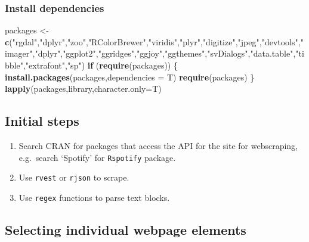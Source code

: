 \documentclass[10,portrait]{article}
\newenvironment{Shaded}{\begin{snugshade}}{\end{snugshade}}
\newcommand{\KeywordTok}[1]{\textcolor[rgb]{0.13,0.29,0.53}{\textbf{#1}}}
\newcommand{\DataTypeTok}[1]{\textcolor[rgb]{0.13,0.29,0.53}{#1}}
\newcommand{\StringTok}[1]{\textcolor[rgb]{0.31,0.60,0.02}{#1}}
\newcommand{\ControlFlowTok}[1]{\textcolor[rgb]{0.13,0.29,0.53}{\textbf{#1}}}
\newcommand{\NormalTok}[1]{#1}
\providecommand{\tightlist}{%
  \setlength{\itemsep}{0pt}\setlength{\parskip}{0pt}}
\begin{document}
\subsubsection{Install dependencies}\label{install-dependencies}

\begin{Shaded}
\begin{Highlighting}[]
\NormalTok{packages <-}\StringTok{ }\KeywordTok{c}\NormalTok{(}\StringTok{"rgdal"}\NormalTok{,}\StringTok{"dplyr"}\NormalTok{,}\StringTok{"zoo"}\NormalTok{,}\StringTok{"RColorBrewer"}\NormalTok{,}\StringTok{"viridis"}\NormalTok{,}\StringTok{"plyr"}\NormalTok{,}\StringTok{"digitize"}\NormalTok{,}\StringTok{"jpeg"}\NormalTok{,}\StringTok{"devtools"}\NormalTok{,}\StringTok{"imager"}\NormalTok{,}\StringTok{"dplyr"}\NormalTok{,}\StringTok{"ggplot2"}\NormalTok{,}\StringTok{"ggridges"}\NormalTok{,}\StringTok{"ggjoy"}\NormalTok{,}\StringTok{"ggthemes"}\NormalTok{,}\StringTok{"svDialogs"}\NormalTok{,}\StringTok{"data.table"}\NormalTok{,}\StringTok{"tibble"}\NormalTok{,}\StringTok{"extrafont"}\NormalTok{,}\StringTok{"sp"}\NormalTok{)   }
\ControlFlowTok{if}\NormalTok{ (}\KeywordTok{require}\NormalTok{(packages)) \{}
    \KeywordTok{install.packages}\NormalTok{(packages,}\DataTypeTok{dependencies =}\NormalTok{ T)}
    \KeywordTok{require}\NormalTok{(packages)}
\NormalTok{\}}
\KeywordTok{lapply}\NormalTok{(packages,library,}\DataTypeTok{character.only=}\NormalTok{T)}
\end{Highlighting}
\end{Shaded}

\subsection{Initial steps}\label{initial-steps}

\begin{enumerate}
\def\labelenumi{\arabic{enumi}.}
\tightlist
\item
  Search CRAN for packages that access the API for the site for
  webscraping, e.g.~search `Spotify' for \texttt{Rspotify} package.\\
\item
  Use \texttt{rvest} or \texttt{rjson} to scrape.\\
\item
  Use \texttt{regex} functions to parse text blocks.
\end{enumerate}

\subsection{Selecting individual webpage
elements}\label{selecting-individual-webpage-elements}
\end{document}
